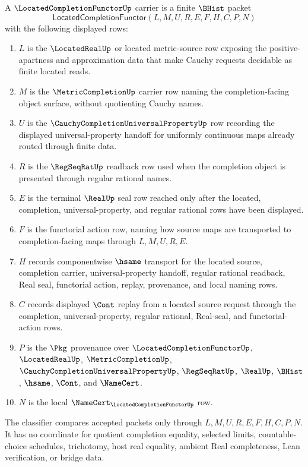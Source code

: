 \begin{definition}
\label{def:located-completion-functor-carrier}
A $\LocatedCompletionFunctorUp$ carrier is a finite $\BHist$ packet
$$
\mathsf{LocatedCompletionFunctor}(L,M,U,R,E,F,H,C,P,N)
$$
with the following displayed rows:
\begin{enumerate}
\item $L$ is the $\LocatedRealUp$ or located metric-source row exposing the positive-apartness and approximation data that make Cauchy requests decidable as finite located reads.
\item $M$ is the $\MetricCompletionUp$ carrier row naming the completion-facing object surface, without quotienting Cauchy names.
\item $U$ is the $\CauchyCompletionUniversalPropertyUp$ row recording the displayed universal-property handoff for uniformly continuous maps already routed through finite data.
\item $R$ is the $\RegSeqRatUp$ readback row used when the completion object is presented through regular rational names.
\item $E$ is the terminal $\RealUp$ seal row reached only after the located, completion, universal-property, and regular rational rows have been displayed.
\item $F$ is the functorial action row, naming how source maps are transported to completion-facing maps through $L,M,U,R,E$.
\item $H$ records componentwise $\hsame$ transport for the located source, completion carrier, universal-property handoff, regular rational readback, Real seal, functorial action, replay, provenance, and local naming rows.
\item $C$ records displayed $\Cont$ replay from a located source request through the completion, universal-property, regular rational, Real-seal, and functorial-action rows.
\item $P$ is the $\Pkg$ provenance over $\LocatedCompletionFunctorUp$, $\LocatedRealUp$, $\MetricCompletionUp$, $\CauchyCompletionUniversalPropertyUp$, $\RegSeqRatUp$, $\RealUp$, $\BHist$, $\hsame$, $\Cont$, and $\NameCert$.
\item $N$ is the local $\NameCert_{\LocatedCompletionFunctorUp}$ row.
\end{enumerate}
The classifier compares accepted packets only through $L,M,U,R,E,F,H,C,P,N$. It has no coordinate for quotient completion equality, selected limits, countable-choice schedules, trichotomy, host real equality, ambient Real completeness, Lean verification, or bridge data.
\end{definition}

